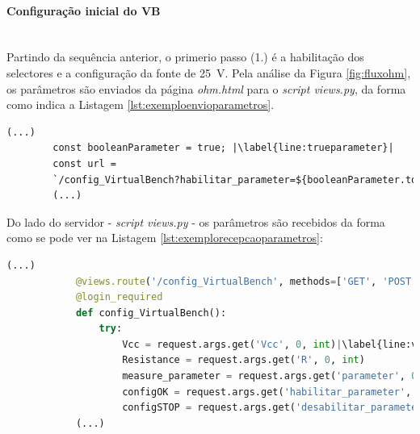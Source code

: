\paragraph{Configuração inicial do VB} ~\\
Partindo da sequência anterior, o primerio passo (1.) é a habilitação dos selectores e a configuração da fonte de \SI{25}{\volt}. Pela análise da Figura \ref{fig:fluxohm}, os parâmetros são enviados da página \textit{ohm.html} para o \textit{script views.py}, da forma como indica a Listagem \ref{lst:exemploenvioparametros}.

\begin{center}
	\begin{minipage}{0.7\linewidth}
		\begin{lstlisting}[language=Html,escapechar=|, caption=Envio de parâmetros da página \textit{ohm.html} para o \textit{script views.py}, label=lst:exemploenvioparametros]
		(...)
		const booleanParameter = true; |\label{line:trueparameter}|
		const url = 
		`/config_VirtualBench?habilitar_parameter=${booleanParameter.toString()}`
		(...)
	\end{lstlisting}
	\end{minipage}
\end{center}

Do lado do servidor - \textit{script views.py} - os parâmetros são recebidos da forma como se pode ver na Listagem \ref{lst:exemplorecepcaoparametros}:
\begin{center}
	\begin{minipage}{1\linewidth}
		\begin{lstlisting}[language=Python,escapechar=|, caption=Recepção dos parâmetros no \textit{script views.py} enviados da página \textit{ohm.html}, label=lst:exemplorecepcaoparametros]
			(...)
			@views.route('/config_VirtualBench', methods=['GET', 'POST'])
			@login_required
			def config_VirtualBench():
				try:
					Vcc = request.args.get('Vcc', 0, int)|\label{line:vccref}|
					Resistance = request.args.get('R', 0, int)
					measure_parameter = request.args.get('parameter', 0, str)|\label{line:measureref}|
					configOK = request.args.get('habilitar_parameter', 0, bool)
					configSTOP = request.args.get('desabilitar_parameter', 0, bool)|\label{line:stopref}|
			(...)
		\end{lstlisting}
	\end{minipage}
\end{center}

